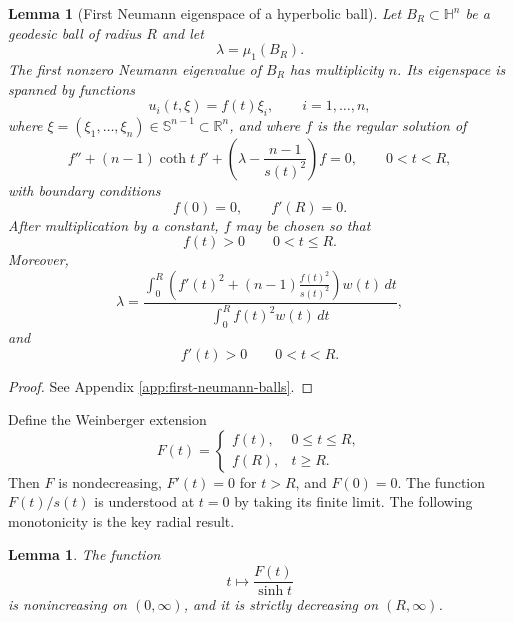 \documentclass[10pt,a4paper]{amsart}
\newtheorem{lemma}[theorem]{Lemma}
\newcommand{\HH}{\mathbb H}
\newcommand{\RR}{\mathbb R}
\newcommand{\Sn}{\mathbb S}
\begin{document}
\begin{lemma}[First Neumann eigenspace of a hyperbolic ball]\label{lem:hyperbolic-ball-facts}
Let $B_R\subset\HH^n$ be a geodesic ball of radius $R$ and let
$$
        \lambda=\mu_1(B_R).
$$
The first nonzero Neumann eigenvalue of $B_R$ has multiplicity $n$.  Its eigenspace is spanned by functions
$$
        u_i(t,\xi)=f(t)\xi_i,
        \qquad i=1,\dots,n,
$$
where $\xi=(\xi_1,\dots,\xi_n)\in\Sn^{n-1}\subset\RR^n$, and where $f$ is the regular solution of
\begin{equation}\label{eq:hyperbolic-ball-ode}
        f''+(n-1)\coth t\,f'
        +\left(\lambda-\frac{n-1}{s(t)^2}\right)f=0,
        \qquad 0<t<R,
\end{equation}
with boundary conditions
\begin{equation}\label{eq:hyperbolic-ball-bc}
        f(0)=0,
        \qquad
        f'(R)=0.
\end{equation}
After multiplication by a constant, $f$ may be chosen so that
$$
        f(t)>0\qquad 0<t\le R.
$$
Moreover,
\begin{equation}\label{eq:hyperbolic-ball-rayleigh}
        \lambda
        =\frac{\displaystyle\int_0^R\left(f'(t)^2+(n-1)\frac{f(t)^2}{s(t)^2}\right)w(t)\,dt}
        {\displaystyle\int_0^R f(t)^2w(t)\,dt},
\end{equation}
and
\begin{equation}\label{eq:hyperbolic-f-prime-positive}
        f'(t)>0\qquad 0<t<R.
\end{equation}
\end{lemma}

\begin{proof}
See Appendix \ref{app:first-neumann-balls}.
\end{proof}

Define the Weinberger extension
\begin{equation}\label{eq:hyperbolic-F-def}
        F(t)=
        \begin{cases}
        f(t),&0\le t\le R,\\
        f(R),&t\ge R.
        \end{cases}
\end{equation}
Then $F$ is nondecreasing, $F'(t)=0$ for $t>R$, and $F(0)=0$.  The function $F(t)/s(t)$ is understood at $t=0$ by taking its finite limit.  The following monotonicity is the key radial result.

\begin{lemma}\label{lem:hyperbolic-F-over-sinh}
The function
$$
        t\longmapsto \frac{F(t)}{\sinh t}
$$
is nonincreasing on $(0,\infty)$, and it is strictly decreasing on $(R,\infty)$.
\end{lemma}
\end{document}
